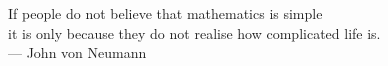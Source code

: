 \thispagestyle{empty}
{}

\vspace*{3cm}

\begin{center}
    If people do not believe that mathematics 
    is simple\\ it is only because they do not
    realise how complicated life is.\\ \medskip
    --- John von Neumann    
\end{center}
